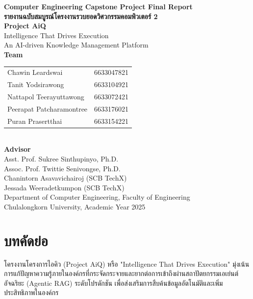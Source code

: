 \documentclass[12pt]{article}
\begin{document}
\begin{center}
    {\large\bfseries Computer Engineering Capstone Project Final Report}\\[1pc]
    {\Large\bfseries รายงานฉบับสมบูรณ์โครงงานรวบยอดวิศวกรรมคอมพิวเตอร์ 2}\\[2pc]
    
    {\Large\bfseries Project AiQ}\\[0.5pc]
    {\large Intelligence That Drives Execution}\\[0.5pc]
    {\large An AI-driven Knowledge Management Platform}\\[2pc]
    
    {\large\bfseries Team}\\[0.5pc]
    \begin{tabular}{ll}
        Chawin Leardswai & 6633047821 \\
        Tanit Yodsirawong & 6633104921 \\
        Nattapol Teerayuttawong & 6633072421 \\
        Peerapat Patcharamontree & 6633176021 \\
        Puran Prasertthai & 6633154221 \\
    \end{tabular}\\[2pc]
    
    {\large\bfseries Advisor}\\[0.5pc]
    Asst. Prof. Sukree Sinthupinyo, Ph.D. \\
    Assoc. Prof. Twittie Senivongse, Ph.D. \\
    Chanintorn Asavavichairoj (SCB TechX) \\
    Jessada Weeradetkumpon (SCB TechX) \\[2pc]
    
    Department of Computer Engineering, Faculty of Engineering\\
    Chulalongkorn University, Academic Year 2025
\end{center}

\newpage

\section*{บทคัดย่อ}
โครงงานโครงการไอคิว (Project AiQ) หรือ "Intelligence That Drives Execution" มุ่งเน้นการแก้ปัญหาความรู้ภายในองค์กรที่กระจัดกระจายและยากต่อการเข้าถึงผ่านสถาปัตยกรรมเอเย่นต์อัจฉริยะ (Agentic RAG) ระดับโปรดักชัน เพื่อส่งเสริมการสืบค้นข้อมูลอัตโนมัติและเพิ่มประสิทธิภาพในองค์กร
\end{document}

